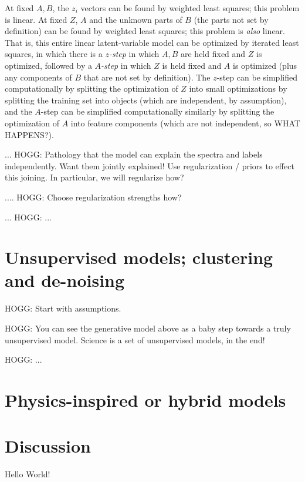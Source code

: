 \documentclass[modern]{aastex631}
\begin{document}
At fixed $A, B$, the $z_i$ vectors can be found by weighted least squares; this problem is linear.
At fixed $Z$, $A$ and the unknown parts of $B$ (the parts not set by definition) can be found by weighted least squares; this problem is \emph{also} linear.
That is, this entire linear latent-variable model can be optimized by iterated least squares, in which there is a \emph{$z$-step} in which $A, B$ are held fixed and $Z$ is optimized, followed by a \emph{$A$-step} in which $Z$ is held fixed and $A$ is optimized (plus any components of $B$ that are not set by definition).
The $z$-step can be simplified computationally by splitting the optimization of $Z$ into small optimizations by splitting the training set into objects (which are independent, by assumption), and the $A$-step can be simplified computationally similarly by splitting the optimization of $A$ into feature components (which are not independent, so WHAT HAPPENS?).

... HOGG: Pathology that the model can explain the spectra and labels independently. Want them jointly explained! Use regularization / priors to effect this joining. In particular, we will regularize how?

.... HOGG: Choose regularization strengths how?

... HOGG: ...

\section{Unsupervised models; clustering and de-noising}

HOGG: Start with assumptions.

HOGG: You can see the generative model above as a baby step towards a truly unsupervised model. Science is a set of unsupervised models, in the end!

HOGG: ...

\section{Physics-inspired or hybrid models}

\section{Discussion}

Hello World!

{}

\end{document}
